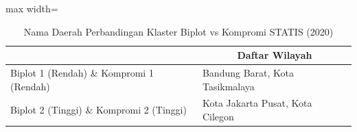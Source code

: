 \begin{table}[H]
\centering
\caption{Nama Daerah Perbandingan Klaster Biplot vs Kompromi STATIS (2020)} \label{tab:sample2biplot_comp_name_2020}
\begin{adjustbox}{max width=\textwidth}
\begin{tabular}{|>{\centering\arraybackslash}p{4cm}|p{10cm}|}
\hline
\multicolumn{1}{|c|}{\textbf{Kategori}} & \multicolumn{1}{c|}{\textbf{Daftar Wilayah}} \\
\hline
Biplot 1 (Rendah) \& Kompromi 1 (Rendah) & Bandung Barat, Kota Tasikmalaya \\
\hline
Biplot 2 (Tinggi) \& Kompromi 2 (Tinggi) & Kota Jakarta Pusat, Kota Cilegon \\
\hline
\end{tabular}
\end{adjustbox}
\end{table}